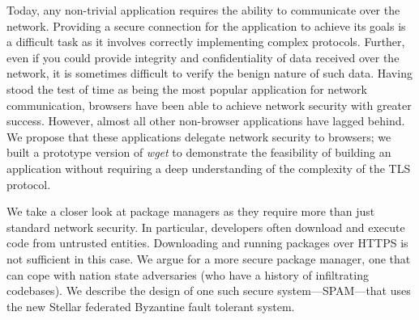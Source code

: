 Today, any non-trivial application requires the ability to communicate over the
network. Providing a secure connection for the application to achieve its goals
is a difficult task as it involves correctly implementing complex protocols.
Further, even if you could provide integrity and confidentiality of data
received over the network, it is sometimes difficult to verify the benign
nature of such data. Having stood the test of time as being the most popular
application for network communication, browsers have been able to achieve
network security with greater success. However, almost all other non-browser
applications have lagged behind. We propose that these applications delegate
network security to browsers; we built a prototype version of \emph{wget} to
demonstrate the feasibility of building an application without requiring a deep
understanding of the complexity of the TLS protocol.

We take a closer look at package managers as they require more than just
standard network security. In particular, developers often download and
execute code from untrusted entities. Downloading and running packages over
HTTPS is not sufficient in this case. We argue for a more secure package manager,
one that can cope with nation state adversaries (who have a history of
infiltrating codebases). We describe the design of one such secure
system---SPAM---that uses the new Stellar federated Byzantine fault tolerant
system.

